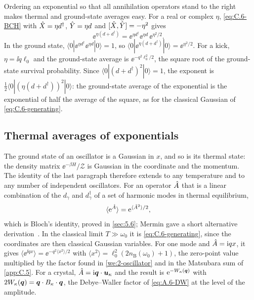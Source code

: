 Ordering an exponential so that all annihilation operators stand to the right makes thermal and ground-state averages easy. For a real or complex $\eta$, \cref{eq:C.6-BCH} with $\hat{X} = \eta d^\dagger$, $\hat{Y} = \eta d$ and $[\hat{X}, \hat{Y}] = -\eta^2$ gives
\begin{equation}
  \ee^{\eta(d + d^\dagger)} = \ee^{\eta d^\dagger}\ee^{\eta d}\,\ee^{\eta^2/2} .
  \label{eq:C.6-normal}
\end{equation}
In the ground state, $\langle0|\ee^{\eta d^\dagger}\ee^{\eta d}|0\rangle = 1$, so $\langle0|\ee^{\eta(d + d^\dagger)}|0\rangle = \ee^{\eta^2/2}$. For a kick, $\eta = \ii q\ell_0$ and the ground-state average is $\ee^{-q^2\ell_0^2/2}$, the square root of the ground-state survival probability. Since $\langle0|(d + d^\dagger)^2|0\rangle = 1$, the exponent is $\tfrac12\langle0|(\eta(d + d^\dagger))^2|0\rangle$: the ground-state average of the exponential is the exponential of half the average of the square, as for the classical Gaussian of \cref{eq:C.6-generating}.

\subsection{Thermal averages of exponentials}

The ground state of an oscillator is a Gaussian in $x$, and so is its thermal state: the density matrix $\ee^{-\beta H}/\mathcal{Z}$ is Gaussian in the coordinate and the momentum. The identity of the last paragraph therefore extends to any temperature and to any number of independent oscillators. For an operator $\hat{A}$ that is a linear combination of the $d_\gamma$ and $d^\dagger_\gamma$ of a set of harmonic modes in thermal equilibrium,
\begin{equation}
  \langle\mathrm{e}^{\hat{A}}\rangle = \mathrm{e}^{\langle \hat{A}^2\rangle/2} ,
  \label{eq:C.6-bloch}
\end{equation}
which is Bloch's identity, proved in \cref{sec:5.6}; Mermin gave a short alternative derivation~\cite{mermin1966short}. In the classical limit $T \gg \omega_0$ it is \cref{eq:C.6-generating}, since the coordinates are then classical Gaussian variables. For one mode and $\hat{A} = \mathrm{i} q x$, it gives $\langle\ee^{\ii qx}\rangle = \ee^{-q^2\langle x^2\rangle/2}$ with $\langle x^2\rangle = \ell_0^2(2n_{\mathrm{B}}(\omega_0) + 1)$, the zero-point value multiplied by the factor found in \cref{we:2-oscillator} and in the Matsubara sum of \cref{app:C.5}. For a crystal, $\hat{A} = \mathrm{i}\bm{q}\cdot\bm{u}_\kappa$ and the result is $\mathrm{e}^{-W_\kappa(\bm{q})}$ with $2W_\kappa(\bm{q}) = \bm{q}\cdot B_\kappa\cdot\bm{q}$, the Debye--Waller factor of \cref{eq:A.6-DW} at the level of the amplitude.

